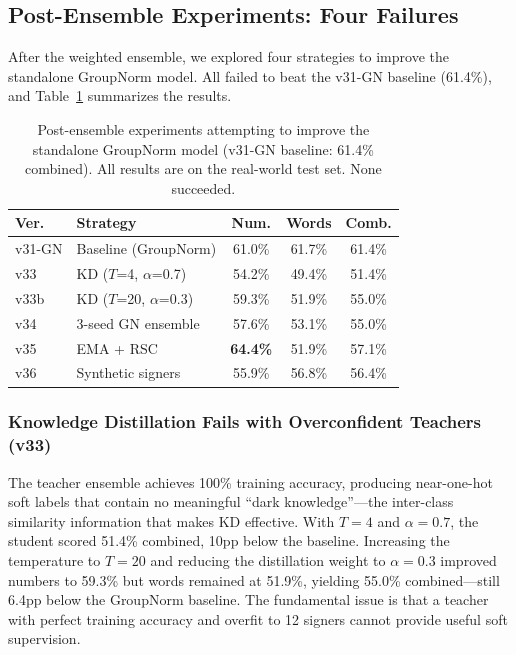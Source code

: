 \documentclass[conference]{IEEEtran}
\begin{document}
\subsection{Post-Ensemble Experiments: Four Failures}
\label{sec:post_ensemble_results}

After the weighted ensemble, we explored four strategies to improve the standalone GroupNorm model. All failed to beat the v31-GN baseline (61.4\%), and Table~\ref{tab:post_ensemble} summarizes the results.

\begin{table}[t]
\centering
\caption{Post-ensemble experiments attempting to improve the standalone GroupNorm model (v31-GN baseline: 61.4\% combined). All results are on the real-world test set. None succeeded.}
\label{tab:post_ensemble}
\small
\begin{tabular}{@{}llccc@{}}
\toprule
\textbf{Ver.} & \textbf{Strategy} & \textbf{Num.} & \textbf{Words} & \textbf{Comb.} \\
\midrule
v31-GN & Baseline (GroupNorm) & 61.0\% & 61.7\% & 61.4\% \\
\midrule
v33 & KD ($T$=4, $\alpha$=0.7) & 54.2\% & 49.4\% & 51.4\% \\
v33b & KD ($T$=20, $\alpha$=0.3) & 59.3\% & 51.9\% & 55.0\% \\
v34 & 3-seed GN ensemble & 57.6\% & 53.1\% & 55.0\% \\
v35 & EMA + RSC & \textbf{64.4\%} & 51.9\% & 57.1\% \\
v36 & Synthetic signers & 55.9\% & 56.8\% & 56.4\% \\
\bottomrule
\end{tabular}
\end{table}

\subsubsection{Knowledge Distillation Fails with Overconfident Teachers (v33)}
The teacher ensemble achieves 100\% training accuracy, producing near-one-hot soft labels that contain no meaningful ``dark knowledge''---the inter-class similarity information that makes KD effective. With $T=4$ and $\alpha=0.7$, the student scored 51.4\% combined, 10pp below the baseline. Increasing the temperature to $T=20$ and reducing the distillation weight to $\alpha=0.3$ improved numbers to 59.3\% but words remained at 51.9\%, yielding 55.0\% combined---still 6.4pp below the GroupNorm baseline. The fundamental issue is that a teacher with perfect training accuracy and overfit to 12 signers cannot provide useful soft supervision.
\end{document}
